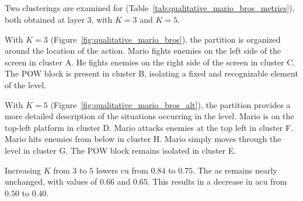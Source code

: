 \newpage
\subsection{\MarioBrosName}

Two clusterings are examined for \MarioBrosName (Table~\ref{tab:qualitative_mario_bros_metrics}), both obtained at layer 3, with $K=3$ and $K=5$.

With $K=3$ (Figure~\ref{fig:qualitative_mario_bros}), the partition is organized around the location of the action.
Mario fights enemies on the left side of the screen in cluster A.
He fights enemies on the right side of the screen in cluster C.
The POW block is present in cluster B, isolating a fixed and recognizable element of the level.

With $K=5$ (Figure~\ref{fig:qualitative_mario_bros_alt}), the partition provides a more detailed description of the situations occurring in the level.
Mario is on the top-left platform in cluster D.
Mario attacks enemies at the top left in cluster F.
Mario hits enemies from below in cluster H.
Mario simply moves through the level in cluster G.
The POW block remains isolated in cluster E.

Increasing $K$ from $3$ to $5$ lowers \gls{cu} from $0.84$ to $0.75$.
The \gls{as} remains nearly unchanged, with values of $0.66$ and $0.65$.
This results in a decrease in \gls{acu} from $0.50$ to $0.40$.

